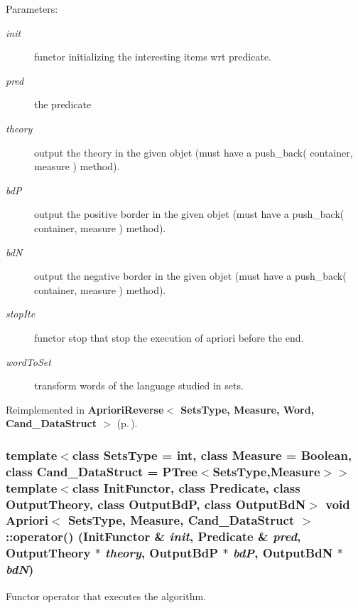 \begin{Desc}
\item[Parameters:]
\begin{description}
\item[{\em init}]functor initializing the interesting items wrt predicate. \item[{\em pred}]the predicate \item[{\em theory}]output the theory in the given objet (must have a push\_\-back( container, measure ) method). \item[{\em bd\-P}]output the positive border in the given objet (must have a push\_\-back( container, measure ) method). \item[{\em bd\-N}]output the negative border in the given objet (must have a push\_\-back( container, measure ) method). \item[{\em stop\-Ite}]functor stop that stop the execution of apriori before the end. \item[{\em word\-To\-Set}]transform words of the language studied in sets. \end{description}
\end{Desc}


Reimplemented in {\bf Apriori\-Reverse$<$ Sets\-Type, Measure, Word, Cand\_\-Data\-Struct $>$} {\rm (p.\,\pageref{class_apriori_reverse_d898f211e89442230c64651031388e3d})}.
\subsubsection{\setlength{\rightskip}{0pt plus 5cm}template$<$class Sets\-Type = int, class Measure = Boolean, class Cand\_\-Data\-Struct = PTree$<$Sets\-Type,Measure$>$$>$ template$<$class Init\-Functor, class Predicate, class Output\-Theory, class Output\-Bd\-P, class Output\-Bd\-N$>$ void {\bf Apriori}$<$ Sets\-Type, Measure, Cand\_\-Data\-Struct $>$::operator() (Init\-Functor \& {\em init}, {\bf Predicate} \& {\em pred}, Output\-Theory $\ast$ {\em theory}, Output\-Bd\-P $\ast$ {\em bd\-P}, Output\-Bd\-N $\ast$ {\em bd\-N})\hspace{0.3cm}{\tt  [inline]}}\label{class_apriori_f0a2087314d1753cc3dd397c4a3f3dda}


Functor operator that executes the algorithm. 

